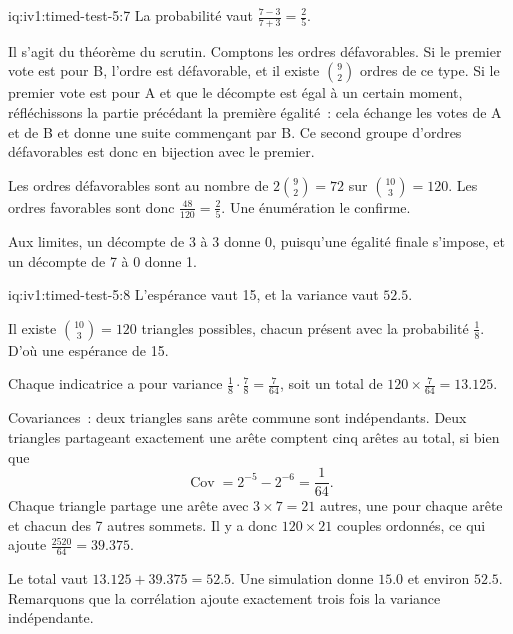 \begin{solution}{iq:iv1:timed-test-5:7}
La probabilité vaut $\frac{7 - 3}{7 + 3} = \frac25$.

Il s'agit du théorème du scrutin. Comptons les ordres défavorables. Si le premier vote est pour B, l'ordre est défavorable, et il existe $\binom92$ ordres de ce type. Si le premier vote est pour A et que le décompte est égal à un certain moment, réfléchissons la partie précédant la première égalité~: cela échange les votes de A et de B et donne une suite commençant par B. Ce second groupe d'ordres défavorables est donc en bijection avec le premier.

Les ordres défavorables sont au nombre de $2\binom92 = 72$ sur $\binom{10}{3} = 120$. Les ordres favorables sont donc $\frac{48}{120} = \frac25$. Une énumération le confirme.

Aux limites, un décompte de 3 à 3 donne 0, puisqu'une égalité finale s'impose, et un décompte de 7 à 0 donne 1.

\end{solution}

\begin{solution}{iq:iv1:timed-test-5:8}
L'espérance vaut 15, et la variance vaut $52.5$.

Il existe $\binom{10}{3} = 120$ triangles possibles, chacun présent avec la probabilité $\frac18$. D'où une espérance de 15.

Chaque indicatrice a pour variance $\frac18 \cdot \frac78 = \frac{7}{64}$, soit un total de $120 \times \frac{7}{64} = 13.125$.

Covariances~: deux triangles sans arête commune sont indépendants. Deux triangles partageant exactement une arête comptent cinq arêtes au total, si bien que
\[
\operatorname{Cov} = 2^{-5} - 2^{-6} = \frac{1}{64}.
\]
Chaque triangle partage une arête avec $3 \times 7 = 21$ autres, une pour chaque arête et chacun des 7 autres sommets. Il y a donc $120 \times 21$ couples ordonnés, ce qui ajoute $\frac{2520}{64} = 39.375$.

Le total vaut $13.125 + 39.375 = 52.5$. Une simulation donne $15.0$ et environ $52.5$. Remarquons que la corrélation ajoute exactement trois fois la variance indépendante.

\end{solution}

